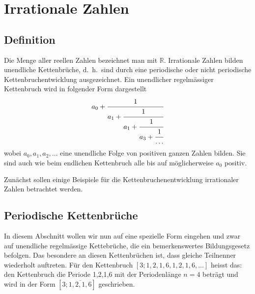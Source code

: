 %
%
%
\section{Irrationale Zahlen
\label{kettenbruch:section:Irrationale Zahlen}}
\subsection{Definition}
Die Menge aller reellen Zahlen bezeichnet man mit $\mathbb{R}$.
Irrationale Zahlen bilden unendliche Kettenbrüche, d.~h.~sind durch
eine periodische oder nicht periodische Kettenbruchentwicklung
ausgezeichnet.
Ein unendlicher regelmässiger Kettenbruch wird in folgender Form dargestellt
\begin{equation}
a_0 + \cfrac{1}{a_1+\cfrac{1}{a_1+\cfrac{1}{a_3+\cfrac{1}{\dots}}}}
\end{equation}
wobei $a_0,a_1,a_2,\dots$ eine unendliche Folge von positiven
ganzen Zahlen bilden. Sie sind auch wie beim endlichen Kettenbruch
alle bis auf möglicherweise $a_0$ positiv.


Zunächst sollen einige Beispiele für die Kettenbruchenentwicklung
irrationaler Zahlen betrachtet werden.

\subsection{Periodische Kettenbrüche}
In diesem Abschnitt wollen wir nun auf eine spezielle Form eingehen
und zwar auf unendliche regelmässige Kettebrüche, die ein bemerkenswertes
Bildungsgesetz befolgen. Das besondere an diesen Kettenbrüchen ist,
dass gleiche Teilnenner wiederholt auftreten.
Für den Kettenbruch $[3;1,2,1,6,1,2,1,6,\dots]$ heisst das: den
Kettenbruch die Periode 1,2,1,6 mit der Periodenlänge $n=4$ beträgt
und wird in der Form $[3;\overline{1,2,1,6}]$ geschrieben.

